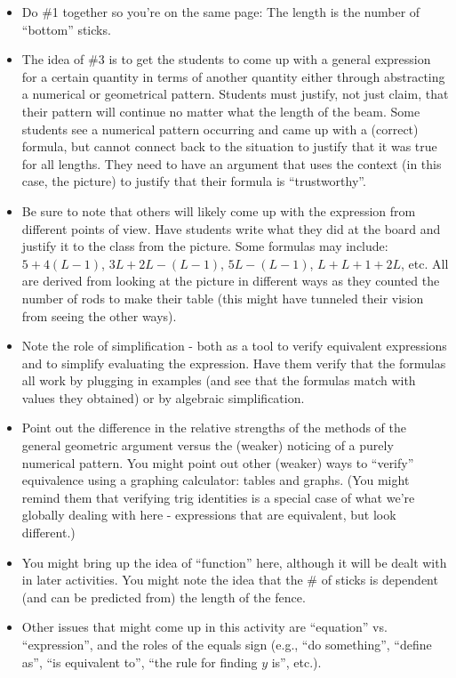 \documentclass{ximera}
\begin{document}
\begin{instructorNotes}
\begin{itemize}
	\item Do \#1 together so you're on the same page: The length is the number of ``bottom'' sticks.
	\item The idea of \#3 is to get the students to come up with a general expression for a certain quantity in terms of another quantity either through abstracting a numerical or geometrical pattern. Students must justify, not just claim, that their pattern will continue no matter what the length of the beam. Some students see a numerical pattern occurring and came up with a (correct) formula, but cannot connect back to the situation to justify that it was true for all lengths. They need to have an argument that uses the context (in this case, the picture) to justify that their formula is ``trustworthy''.
	\item Be sure to note that others will likely come up with the expression from different points of view. Have students write what they did at the board and justify it to the class from the picture. Some formulas may include:
	$5 + 4(L-1)$, $3L + 2L - (L-1)$, $5L - (L-1)$, $L + L+1 + 2L$, etc. All are derived from looking at the picture in different ways as they counted the number of rods to make their table (this might have tunneled their vision from seeing the other ways).  
	\item Note the role of simplification - both as a tool to verify equivalent expressions and to simplify evaluating the expression. Have them verify that the formulas all work by plugging in examples (and see that the formulas match with values they obtained) or by algebraic simplification.
	\item	Point out the difference in the relative strengths of the methods of the general geometric argument versus the (weaker) noticing of a purely numerical pattern. You might point out other (weaker) ways to ``verify'' equivalence using a graphing calculator: tables and graphs. (You might remind them that verifying trig identities is a special case of what we're globally dealing with here - expressions that are equivalent, but look different.)
	\item You might bring up the idea of ``function'' here, although it will be dealt with in later activities. You might note the idea that the \# of sticks is dependent (and can be predicted from) the length of the fence.
	\item Other issues that might come up in this activity are ``equation'' vs. ``expression'', and the roles of the equals sign (e.g., ``do something'', ``define as'', ``is equivalent to'', ``the rule for finding $y$ is'', etc.).
\end{itemize}


\end{instructorNotes}
\end{document}
